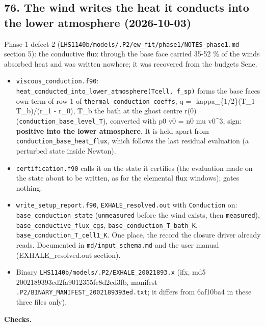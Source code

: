 \documentclass[english,a4paper]{my_memo}
\providecommand{\tightlist}{\setlength{\itemsep}{0pt}\setlength{\parskip}{0pt}}
\begin{document}
\subsection{76. The wind writes the heat it conducts into the lower atmosphere (2026-10-03)}\label{76-the-wind-writes-the-heat-it-conducts-into-the-lower-atmosphere-2026-10-03}

Phase 1 defect 2 (\texttt{LHS1140b/models/.P2/ew\_fit/phase1/NOTES\_phase1.md}
section 5): the conductive flux through the base face carried 35-52 \% of
the wind\textquotesingle s absorbed heat and was written nowhere; it was recovered from
the budget\textquotesingle s Sene.

\begin{itemize}
\tightlist
\item
  \texttt{viscous\_conduction.f90}: \texttt{heat\_conducted\_into\_lower\_atmosphere(Tcell,\ f\_sp)} forms the base face\textquotesingle s own term of row 1 of
  \texttt{thermal\_conduction\_coeffs}, q = -kappa\_\{1/2\}(T\_1 - T\_b)/(r\_1 - r\_0),
  T\_b the bath at the ghost centre r(0) (\texttt{conduction\_base\_level\_T}),
  converted with p0 v0 = n0 mu v0\^{}3, sign: \textbf{positive into the lower
  atmosphere}. It is held apart from \texttt{conduction\_base\_heat\_flux}, which
  follows the last residual evaluation (a perturbed state inside Newton).
\item
  \texttt{certification.f90} calls it on the state it certifies (the evaluation
  made on the state about to be written, as for the elemental flux
  windows); gates nothing.
\item
  \texttt{write\_setup\_report.f90}, \texttt{EXHALE\_resolved.out} with \texttt{Conduction} on:
  \texttt{base\_conduction\_state} (\texttt{unmeasured} before the wind exists, then
  \texttt{measured}), \texttt{base\_conductive\_flux\_cgs}, \texttt{base\_conduction\_T\_bath\_K},
  \texttt{base\_conduction\_T\_cell1\_K}. One place, the record the closure driver
  already reads. Documented in \texttt{md/input\_schema.md} and the user manual
  (EXHALE\_resolved.out section).
\item
  Binary \texttt{LHS1140b/models/.P2/EXHALE\_20021893.x} (ifx, md5
  2002189393ed2fa9012355fc8d2cd3fb, manifest
  \texttt{.P2/BINARY\_MANIFEST\_2002189393ed.txt}; it differs from 6af10ba4 in
  these three files only).
\end{itemize}

\textbf{Checks.}
\end{document}
